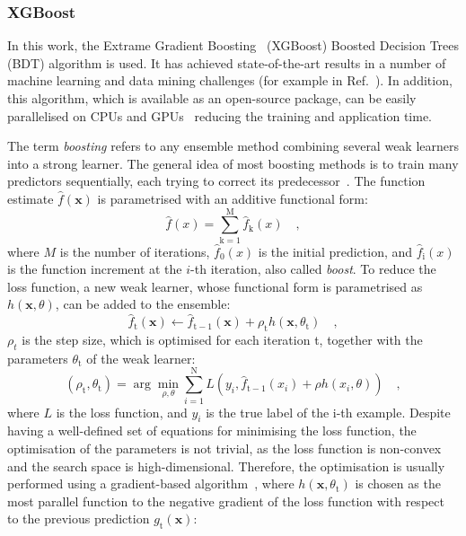 \subsubsection{XGBoost}
In this work, the Extrame Gradient Boosting~\cite{DBLP:xgboost} (XGBoost) Boosted Decision Trees (BDT) algorithm is used. It has achieved state-of-the-art results in a number of machine learning and data mining challenges (for example in Ref.~\cite{kaggle:higgs}). In addition, this algorithm, which is available as an open-source package, can be easily parallelised on CPUs and GPUs~\cite{mitchell2017accelerating} reducing the training and application time.

The term \emph{boosting} refers to any ensemble method combining several weak learners into a strong learner. The general idea of most boosting methods is to train many predictors sequentially, each trying to correct its predecessor~\cite{geron2022hands}. The function estimate $\widehat{f}(\mathbf{x})$ is parametrised with an additive functional form:
\begin{equation*}
    \widehat{f}(x) = \sum_{\mathrm{k}=1}^{\mathrm{M}} \widehat{f}_\mathrm{k}(x)\quad ,
\end{equation*}
where $M$ is the number of iterations, $\widehat{f}_\mathrm{0}(x)$ is the initial prediction, and $\widehat{f}_\mathrm{i}(x)$ is the function increment at the $i$-th iteration, also called \emph{boost}. To reduce the loss function, a new weak learner, whose functional form is parametrised as $h(\mathbf{x},\theta)$, can be added to the ensemble:
\begin{equation*}
    \widehat{f}_\mathrm{t}(\mathbf{x}) \leftarrow \widehat{f}_{\mathrm{t}-1}(\mathbf{x}) + \rho_\mathrm{t} h(\mathbf{x},\theta_\mathrm{t})\quad ,
\end{equation*}
$\rho_t$ is the step size, which is optimised for each iteration t, together with the parameters $\theta_\mathrm{t}$ of the weak learner:
\begin{equation*}
    (\rho_\mathrm{t}, \theta_\mathrm{t}) = \arg\min_{\rho,\theta} \sum_{{i}=1}^{\mathrm{N}} L\left(y_i, \widehat{f}_{\mathrm{t}-1}(x_i) + \rho h(x_i,\theta)\right)\quad ,
\end{equation*}
where $L$ is the loss function, and $y_i$ is the true label of the i-th example. Despite having a well-defined set of equations for minimising the loss function, the optimisation of the parameters is not trivial, as the loss function is non-convex and the search space is high-dimensional. Therefore, the optimisation is usually performed using a gradient-based algorithm~\cite{friedman2001greedy,natekin2013gradient}, where $h(\mathbf{x},\theta_\mathrm{t})$ is chosen as the most parallel function to the negative gradient of the loss function with respect to the previous prediction $g_\mathrm{t}(\mathbf{x})$:
